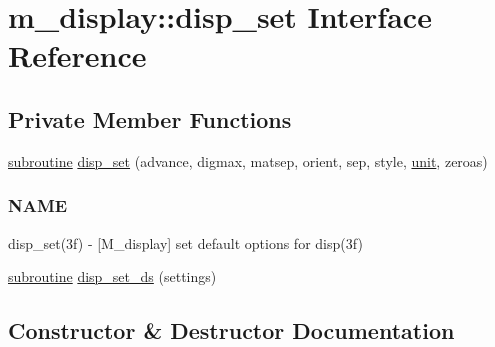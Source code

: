 \hypertarget{interfacem__display_1_1disp__set}{}\section{m\+\_\+display\+:\+:disp\+\_\+set Interface Reference}
\label{interfacem__display_1_1disp__set}
\subsection*{Private Member Functions}
\begin{DoxyCompactItemize}
\item 
\hyperlink{M__stopwatch_83_8txt_acfbcff50169d691ff02d4a123ed70482}{subroutine} \hyperlink{interfacem__display_1_1disp__set_a3ed84626a8c0aec68c1c44b2e887e742}{disp\+\_\+set} (advance, digmax, matsep, orient, sep, style, \hyperlink{M__stopwatch_83_8txt_a5cbef30eb7c0d734bd82f5a7ebea9aa7}{unit}, zeroas)
\begin{DoxyCompactList}\small\item\em \subsubsection*{N\+A\+ME}

disp\+\_\+set(3f) -\/ \mbox{[}M\+\_\+display\mbox{]} set default options for disp(3f) \end{DoxyCompactList}\item 
\hyperlink{M__stopwatch_83_8txt_acfbcff50169d691ff02d4a123ed70482}{subroutine} \hyperlink{interfacem__display_1_1disp__set_a763734e87c92afbf37d059cea632d541}{disp\+\_\+set\+\_\+ds} (settings)
\end{DoxyCompactItemize}


\subsection{Constructor \& Destructor Documentation}
\mbox{\label{interfacem__display_1_1disp__set_a3ed84626a8c0aec68c1c44b2e887e742}} 
